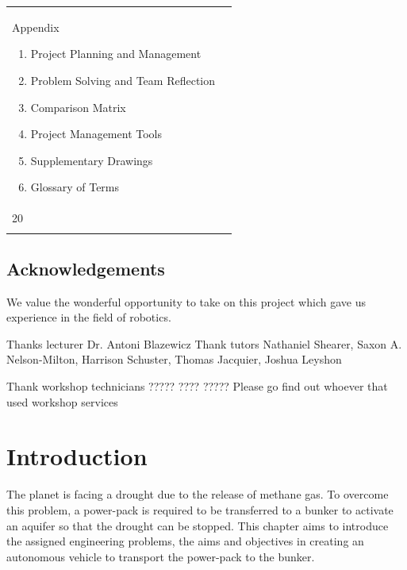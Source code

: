 \documentclass[12pt]{report}
\begin{document}
\begin{tabular}{ p{} p{} }
Appendix
\begin{enumerate}[label=\Alph*.]
\item Project Planning and Management
\item Problem Solving and Team Reflection
\item Comparison Matrix 
\item Project Management Tools 
\item Supplementary Drawings 
\item Glossary of Terms 
\end{enumerate}
&
\begin{flushright}
\vspace{-0.3cm}
\item []  19 \\[0.25\linewidth]
\item []  20 \\[0.3\linewidth]
\end{flushright}

\tabularnewline
\end{tabular}
\pagebreak

\section*{Acknowledgements}
We value the wonderful opportunity to take on this project which gave us experience in the field of robotics. 

Thanks lecturer Dr. Antoni Blazewicz
Thank tutors Nathaniel Shearer, Saxon A. Nelson-Milton, Harrison Schuster, Thomas Jacquier, Joshua Leyshon

Thank workshop technicians ????? ???? ?????  Please go find out whoever that used workshop services
\pagebreak

\chapter{Introduction}

The planet is facing a drought due to the release of methane gas. To overcome this problem, a power-pack is required to be transferred to a bunker to activate an aquifer so that the drought can be stopped. This chapter aims to introduce the assigned engineering problems, the aims and objectives in creating an autonomous vehicle to transport the power-pack to the bunker.
\end{document}
